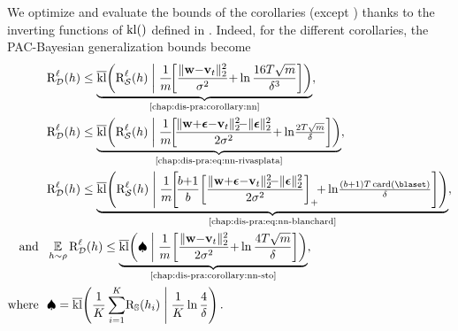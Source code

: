 \begin{noaddcontents}
We optimize and evaluate the bounds of the corollaries (except ) thanks to the inverting functions of $\operatorname{kl}()$ defined in .
Indeed, for the different corollaries, the PAC-Bayesian generalization bounds become
\begin{align*}
&\RiskLoss_{\D}(\h) \le \underbrace{\klmax\!\LP\RiskLoss_{\dS}(\h) \;\middle\vert\; \frac{1}{\m}\!\!\left[ \frac{\|\wbf{-}\vbf_\t\|_{2}^{2}}{\sigma^2}{+}\ln\frac{16\iter\sqrt{\m}}{\delta^3}\right]\RP}_{\text{\Cref{chap:dis-pra:corollary:nn}}},\\
&\RiskLoss_{\D}(\h) \le \underbrace{\klmax\!\LP\RiskLoss_{\dS}(\h) \;\middle\vert\; \frac{1}{\m}\!\!\LB\!\frac{\| \wbf{+}\epsilonbf{-}\vbf_\t\|^2_{2}\!{-}\|\epsilonbf\|^2_{2}}{2\sigma^2}{+} \ln\!\tfrac{2\iter\sqrt{\m}}{\delta}\RB\RP}_{\text{\Cref{chap:dis-pra:eq:nn-rivasplata}}},\\
&\RiskLoss_{\D}(\h) \le \underbrace{\klmax\!\LP\RiskLoss_{\dS}(\h) \;\middle\vert\; \frac{1}{\m}\!\!\LB\!\frac{b{+}1}{b}\!\LB\frac{\| \wbf{+}\epsilonbf{-}\vbf_\t\|^2_{2}\!{-}\|\epsilonbf\|^2_{2}}{2\sigma^2}\RB_{+}\!\!{+} \ln\!\tfrac{(b+1)\iter\card(\blaset)}{\delta}\RB\RP}_{\text{\Cref{chap:dis-pra:eq:nn-blanchard}}},\\
\text{and }\ &\EE_{\h\sim\Q}\RiskLoss_{\D}(\h) \le \underbrace{\klmax\!\LP \spadesuit \;\middle\vert\; \frac{1}{\m}\!\LB \frac{\|\wbf{-}\vbf_\t\|_{2}^{2}}{2\sigma^2} {+}\ln\frac{4\iter\sqrt{\m}}{\delta}\RB\RP}_{\text{\Cref{chap:dis-pra:corollary:nn-sto}}},\\
\text{where }\ & \spadesuit = \klmax\!\LP \frac{1}{\K}\sum_{i=1}^{\K}\!\Risk_{\S}(\h_i) \;\middle\vert\; \frac{1}{\K} \ln\frac{4}{\delta}\RP.
\end{align*}


\end{noaddcontents}
